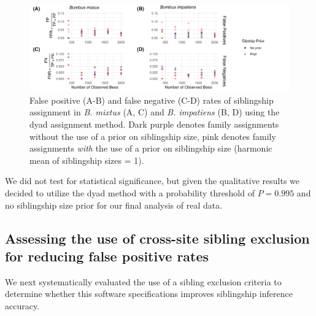 \documentclass[12pt]{article}
\begin{document}
\begin{figure}[H]
    \centering
    \includegraphics[width=\linewidth]{appendix_figures/sibprior_dyads.jpg}
    \caption{False positive (A-B) and false negative (C-D) rates of siblingship assignment in \emph{B. mixtus} (A, C) and \emph{B. impatiens} (B, D) using the dyad assignment method. Dark purple denotes family assignments without the use of a prior on siblingship size, pink denotes family assignments \emph{with} the use of a prior on siblingship size (harmonic mean of siblingship sizes = 1).}
    \label{fig:sibprior_dyads}
\end{figure}


We did not test for statistical significance, but given the qualitative results we decided to utilize the dyad method with a probability threshold of $P = 0.995$ and no siblingship size prior for our final analysis of real data. 


\subsection{Assessing the use of cross-site sibling exclusion for reducing false positive rates}

We next systematically evaluated the use of a sibling exclusion criteria to determine whether this software specifications improves siblingship inference accuracy. 
\end{document}
